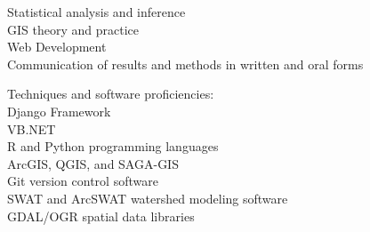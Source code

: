 \documentclass{article}
\begin{document}
\parbox[t][3cm][t]{0.4\textwidth}{\textbullet Statistical analysis and inference\\
\textbullet GIS theory and practice\\
\textbullet Web Development\\
\textbullet Communication of results and methods in written and oral forms} 
\parbox[t][2.5cm][t]{0.07\textwidth}{\hfil}
\parbox[t][3.2cm][t]{0.45\textwidth}{Techniques and software proficiencies:\\
\small{
	\textbullet Django Framework\\
	\textbullet VB.NET\\	
	\textbullet R and Python programming languages\\
	\textbullet ArcGIS, QGIS, and SAGA-GIS\\
	\textbullet Git version control software\\
	\textbullet SWAT and ArcSWAT watershed modeling software\\
	\textbullet GDAL/OGR spatial data libraries\\
}}
\end{document}
